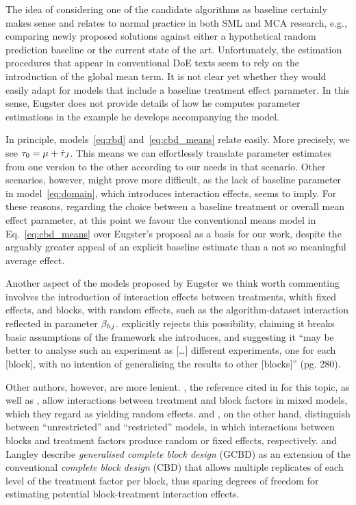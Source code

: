 The idea of considering one of the candidate algorithms as
baseline certainly makes sense and relates to normal practice
in both SML and MCA research,
e.g., comparing newly proposed solutions against either a hypothetical 
random prediction baseline or the current state of the art.
%
Unfortunately, the estimation procedures that appear in conventional
DoE texts
seem to rely on the introduction of the global mean term.
%
It is not clear yet whether they would easily adapt for models 
that include a baseline treatment effect parameter.
%
In this sense, Eugster does not provide details of how he computes
parameter estimations in the example he develops accompanying
the model.

In principle, models~\ref{eq:rbd} and~\ref{eq:cbd_means} relate easily.
%
More precisely, we see 
$\tau_{0} = \mu + \dot{\tau}_{J}$.
%
This means we can effortlessly translate parameter estimates from one
version to the other according to our needs in that scenario.
%
Other scenarios, however, might prove more difficult,
as the lack of baseline parameter in model~\ref{eq:domain},
which introduces interaction effects, seems to imply. 
%
For these reasons, regarding the choice between a baseline treatment
or overall mean effect parameter,
at this point we favour the conventional means model 
in Eq.~\ref{eq:cbd_means} over Eugster's proposal as a basis for our work,
%
despite the arguably greater appeal of an explicit baseline estimate 
than a not so meaningful average effect.

Another aspect of the models proposed by Eugster we think worth
commenting involves the introduction of interaction effects between
treatments, whith fixed effects, and blocks, with random effects,
such as the algorithm-dataset interaction reflected in parameter
$\beta_{hj}$.
%
\citet{BaileyDCE} explicitly rejects this possibility,
claiming it breaks basic assumptions of the framework she introduces,
and suggesting it
``may be better to analyse such an experiment as [\dots] different
experiments, one for each [block], with no intention of generalising
the results to other [blocks]'' (pg. 280).

Other authors, however, are more lenient.
%
\citet{PinheiroMEMS}, the reference
cited in \citep{EugsterPhD} for this topic,
as well as \citet{MontgomeryDAE},
allow interactions between treatment and block factors
in mixed models, which they regard as yielding random effects.
%
\citet{NeterALSM} and \citet{CobbIDAE},
on the other hand, distinguish between ``unrestricted'' and 
``restricted'' models, in which interactions between blocks
and treatment factors produce random or fixed effects, respectively.
%
\citet{CobbIDAE} and  Langley \citet{LawsonDAER} describe
\emph{generalised complete block design} (GCBD) as 
an extension of the conventional \emph{complete block design} (CBD)
that allows multiple replicates
of each level of the treatment factor per block,
thus sparing degrees of freedom for estimating potential 
block-treatment interaction effects.

